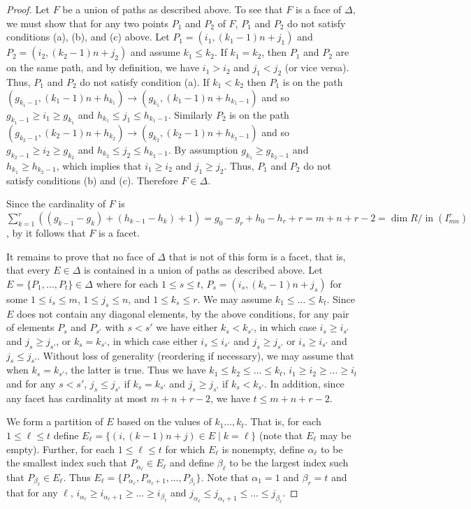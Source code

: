 \documentclass[12pt]{amsart}
\numberwithin{equation}{section}
\theoremstyle{definition}
\DeclareMathOperator{\ini}{in}
\begin{document}
  \begin{proof}
  Let $F$ be a union of paths as described above.  To see that $F$ is a face of $\Delta$, we must show that for any two points  $P_1$ and $P_2$ of $F$, $P_1$ and $P_2$ do not satisfy conditions (a), (b), and (c) above.  Let $P_1 = (i_1, (k_1-1)n+j_1)$ and $P_2 = (i_2, (k_2-1)n+j_2)$ and assume $k_1 \leq k_2$.   If $k_1=k_2$, then $P_1$ and $P_2$ are on the same path, and by definition, we have $i_1 >i_2$ and $j_1 <j_2$ (or vice versa). Thus, $P_1$ and $P_2$ do not satisfy condition (a).  If $k_1 < k_2$ then $P_1$ is on the path $(g_{k_1-1}, (k_1-1)n+h_{k_1}) \longrightarrow (g_{k_1}, (k_1-1)n+h_{k_1-1})$ and so $g_{k_1-1} \geq i_1 \geq g_{k_1}$ and $ h_{k_1} \leq j_1 \leq h_{k_1-1}$.  Similarly $P_2$ is on the path  $(g_{k_2-1}, (k_2-1)n+h_{k_2}) \to (g_{k_2}, (k_2-1)n+h_{k_2-1})$ and so $g_{k_2-1} \geq i_2 \geq g_{k_2}$ and $ h_{k_2} \leq j_2 \leq h_{k_2-1}$.  By assumption $g_{k_1} \geq g_{k_2-1}$ and $h_{k_1} \geq h_{k_2-1}$, which implies that $i_1 \geq i_2$ and $j_1 \geq j_2$. Thus, $P_1$ and $P_2$ do not satisfy conditions (b) and (c). Therefore $F \in \Delta$. 
     
      Since the cardinality of $F$ is
      $\sum_{k=1}^{r}((g_{k-1}-g_k)+(h_{k-1}-h_k)+1)= g_0- g_r+h_0-h_r+r = m+n+r-2=\dim R/\ini(I_{mn}^r)$, by \cite[Corollary 6.2.2]{HH} it follows that $F$ is a facet. 
      
It remains to prove that no face of $\Delta$ that is not of this form is a facet, that is, that every $E\in\Delta$ is contained in a union of paths as described above. Let $E=\{P_1, \dots, P_t\} \in \Delta$ where for each $1\leq s\leq t$, $P_s = (i_s, (k_s-1)n+j_s)$ for some $1\leq i_s \leq m$, $ 1 \leq j_s \leq n$, and $1\leq k_s \leq r$.  We may assume $k_1 \leq \dots \leq k_t$. Since $E$ does not contain any diagonal elements, by the above conditions, for any pair of elements $P_s$ and $P_{s'}$ with $s<s'$ we have either $k_s <k_{s'}$, in which case $i_s \geq i_{s'}$ and $j_s \geq j_{s'}$, or $k_s = k_{s'}$, in which case either $i_s \leq i_{s'}$ and $j_s \geq j_{s'}$ or $i_s  \geq i_{s'}$ and $j_s \leq j_{s'}$.  Without loss of generality (reordering if necessary), we may assume that when $k_s = k_{s'}$, the latter is true.  Thus we have $k_1 \leq k_2 \leq \dots \leq k_t$, $i_1\geq i_2 \geq  \dots \geq  i_t$ and for any $s<s'$, $j_s \leq j_{s'}$ if $k_s = k_{s'}$ and $j_s \geq j_{s'}$ if $k_s < k_{s'}$.  In addition, since any facet has cardinality at most $m+n+r-2$, we have $t\leq m+n+r-2$. 

We form a partition of $E$ based on the values of $k_1 \dots, k_t$.  That is, for each $1 \leq \ell \leq t$ define $E_\ell = \{(i, (k-1)n+j) \in E \mid k = \ell\}$ (note that $E_\ell$ may be empty). Further, for each $1 \leq \ell \leq t$ for which $E_\ell$ is nonempty, define $\alpha_\ell$ to be the smallest index such that $P_{\alpha_\ell} \in E_\ell$ and define $\beta_\ell$ to be the largest index such that $P_{\beta_\ell} \in E_\ell$.  Thus $E_\ell = \{P_{\alpha_\ell}, P_{\alpha_\ell+1}, \dots, P_{\beta_\ell}\}$.  Note that $\alpha_1 = 1$ and $\beta_r = t$ and that for any $\ell$, $i_{\alpha_\ell} \geq i_{\alpha_\ell+1} \geq \dots \geq i_{\beta_\ell}$ and $j_{\alpha_\ell} \leq j_{\alpha_\ell +1}\leq \dots \leq j_{\beta_\ell}$.


\end{proof}
\end{document}
